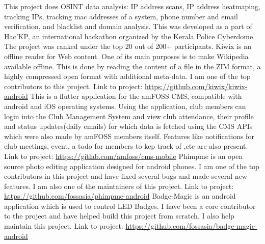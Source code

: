 \documentclass[10pt,a4paper,sans]{moderncv}        %
\begin{document}
{This project does OSINT data analysis: IP address scans, IP address heatmaping, tracking IPs, tracking mac addresses of a system, phone number and email verification, and blacklist and domain analysis. This was developed as a part of Hac'KP, an international hackathon organized by the Kerala Police Cyberdome. The project was ranked under the top 20 out of 200+ participants.}
{Kiwix is an offline reader for Web content. One of its main purposes is to make Wikipedia available offline. This is done by reading the content of a file in the ZIM format, a highly compressed open format with additional meta-data. I am one of the top contributors to this project. Link to project:{\newline}
\url{https://github.com/kiwix/kiwix-android}}{}
{This is a flutter application for the amFOSS CMS, compatible with android and iOS operating systems. Using the application, club members can login into the Club Management System and view club attendance, their profile and status updates(daily emails) for which data is fetched using the CMS APIs which were also made by amFOSS members itself. Features like notifications for club meetings, event, a todo for members to kep track of ,etc are also present. Link to project:{\newline}
\url{https://gitlab.com/amfoss/cms-mobile}}{}
{Phimpme is an open source photo editing application designed for android phones. I am one of the top contributors in this project and have fixed several bugs and made several new features. I am also one of the maintainers of this project. Link to project:{\newline} \url{https://github.com/fossasia/phimpme-android}}{}  %
{Badge-Magic is an android application which is used to control LED Badges. I have been a core contributor to the project and have helped build this project from scratch. I also help maintain this project. Link to project:{\newline} \url{https://github.com/fossasia/badge-magic-android}}{}  %
\end{document}
